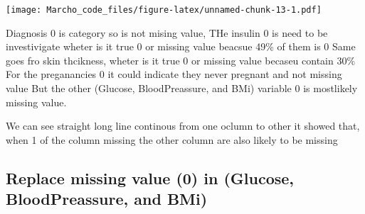 \documentclass[
]{article}
\newenvironment{Shaded}{\begin{snugshade}}{\end{snugshade}}
\newcommand{\AttributeTok}[1]{\textcolor[rgb]{0.77,0.63,0.00}{#1}}
\newcommand{\CommentTok}[1]{\textcolor[rgb]{0.56,0.35,0.01}{\textit{#1}}}
\newcommand{\ConstantTok}[1]{\textcolor[rgb]{0.00,0.00,0.00}{#1}}
\newcommand{\DecValTok}[1]{\textcolor[rgb]{0.00,0.00,0.81}{#1}}
\newcommand{\FunctionTok}[1]{\textcolor[rgb]{0.00,0.00,0.00}{#1}}
\newcommand{\NormalTok}[1]{#1}
\newcommand{\OtherTok}[1]{\textcolor[rgb]{0.56,0.35,0.01}{#1}}
\newcommand{\SpecialCharTok}[1]{\textcolor[rgb]{0.00,0.00,0.00}{#1}}
\begin{document}
\texttt{[image: Marcho\_code\_files/figure-latex/unnamed-chunk-13-1.pdf]}

Diagnosis 0 is category so is not mising value, THe insulin 0 is need to
be investivigate wheter is it true 0 or missing value beacsue 49\% of
them is 0 Same goes fro skin thcikness, wheter is it true 0 or missing
value becaseu contain 30\% For the preganancies 0 it could indicate they
never pregnant and not missing value But the other (Glucose,
BloodPreassure, and BMi) variable 0 is mostlikely missing value.

We can see straight long line continous from one oclumn to other it
showed that, when 1 of the column missing the other column are also
likely to be missing

\hypertarget{replace-missing-value-0-in-glucose-bloodpreassure-and-bmi}{%
\subsection{Replace missing value (0) in (Glucose, BloodPreassure, and
BMi)}\label{replace-missing-value-0-in-glucose-bloodpreassure-and-bmi}}

\begin{Shaded}
\end{Shaded}
\end{document}
